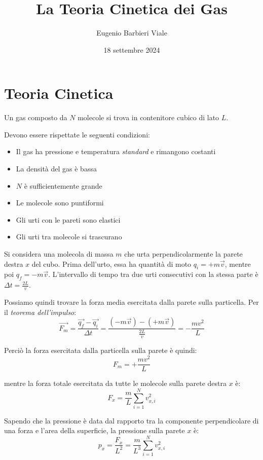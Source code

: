 \documentclass[]{article}
\title{La Teoria Cinetica dei Gas}
\author{Eugenio Barbieri Viale}
\date{18 settembre 2024}
\begin{document}
\maketitle
\setlength\parindent{0pt} %

\section*{Teoria Cinetica}
Un gas composto da $N$ molecole si trova in contenitore cubico di lato $L$. 

Devono essere rispettate le seguenti condizioni:
\begin{itemize}
    \item Il gas ha pressione e temperatura \textit{standard} e rimangono costanti
    \item La densità del gas è bassa
    \item $N$ è sufficientemente grande
    \item Le molecole sono puntiformi
    \item Gli urti con le pareti sono elastici
    \item Gli urti tra molecole si trascurano
\end{itemize}

\vspace{2em}

Si considera una molecola di massa $m$ che urta perpendicolarmente la parete destra $x$ del cubo. Prima dell'urto, essa ha quantità di moto $q_i = +m\vec{v}$, mentre poi $q_f = -m\vec{v}$. L'intervallo di tempo tra due urti consecutivi con la stessa parte è $\Delta t = \frac{2L}{v}$.

\vspace{1em}
Possiamo quindi trovare la forza media esercitata dalla parete sulla particella. Per il \textit{teorema dell'impulso}:
$$\vec{F_m} = \frac{\vec{q_f}-\vec{q_i}}{\Delta t} = \frac{(-m\vec{v}) - (+m\vec{v})}{\frac{2L}{v}} = -\frac{mv^2}{L}$$

Perciò la forza esercitata dalla particella sulla parete è quindi:
$$F_m = +\frac{mv^2}{L}$$

mentre la forza totale esercitata da tutte le molecole sulla parete destra $x$ è:
$$F_x = \frac{m}{L} \sum_{i=1}^{N} v_{x,i}^2$$

Sapendo che la pressione è data dal rapporto tra la componente perpendicolare di una forza e l'area della superficie, la pressione sulla parete $x$ è:
$$p_x = \frac{F_x}{L^2} = \frac{m}{L^3} \sum_{i=1}^{N} v_{x,i}^2$$
\end{document}
